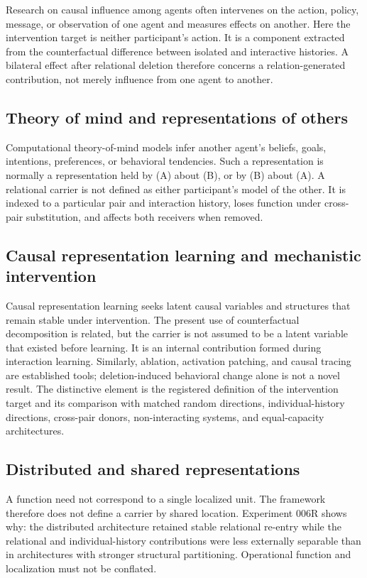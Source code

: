 \documentclass[11pt,a4paper]{article}
\begin{document}
Research on causal influence among agents often intervenes on the action, policy, message, or observation of one agent and measures effects on another. Here the intervention target is neither participant's action. It is a component extracted from the counterfactual difference between isolated and interactive histories. A bilateral effect after relational deletion therefore concerns a relation-generated contribution, not merely influence from one agent to another.

\subsection{Theory of mind and representations of others}

Computational theory-of-mind models infer another agent's beliefs, goals, intentions, preferences, or behavioral tendencies. Such a representation is normally a representation held by (A) about (B), or by (B) about (A). A relational carrier is not defined as either participant's model of the other. It is indexed to a particular pair and interaction history, loses function under cross-pair substitution, and affects both receivers when removed.

\subsection{Causal representation learning and mechanistic intervention}

Causal representation learning seeks latent causal variables and structures that remain stable under intervention. The present use of counterfactual decomposition is related, but the carrier is not assumed to be a latent variable that existed before learning. It is an internal contribution formed during interaction learning. Similarly, ablation, activation patching, and causal tracing are established tools; deletion-induced behavioral change alone is not a novel result. The distinctive element is the registered definition of the intervention target and its comparison with matched random directions, individual-history directions, cross-pair donors, non-interacting systems, and equal-capacity architectures.

\subsection{Distributed and shared representations}

A function need not correspond to a single localized unit. The framework therefore does not define a carrier by shared location. Experiment 006R shows why: the distributed architecture retained stable relational re-entry while the relational and individual-history contributions were less externally separable than in architectures with stronger structural partitioning. Operational function and localization must not be conflated.
\end{document}
